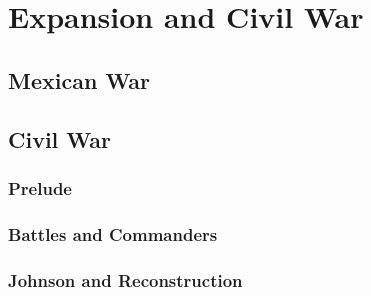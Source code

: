 \chapter{Expansion and Civil War}

\section{Mexican War}

\section{Civil War}

\subsection*{Prelude}

\subsection*{Battles and Commanders}

\subsection*{Johnson and Reconstruction}
